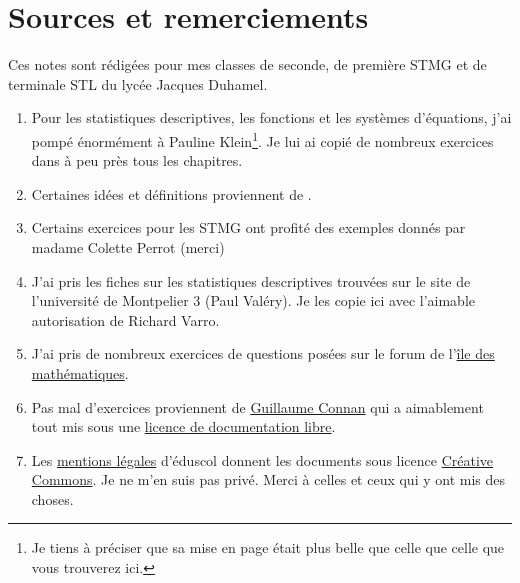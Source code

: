 
\section*{Sources et remerciements}

Ces notes sont rédigées pour mes classes de seconde, de première STMG et de terminale STL du lycée Jacques Duhamel.

\begin{enumerate}
    \item
        Pour les statistiques descriptives, les fonctions et les systèmes d'équations, j'ai pompé énormément à Pauline Klein\footnote{Je tiens à préciser que sa mise en page était plus belle que celle que celle que vous trouverez ici.}. Je lui ai copié de nombreux exercices dans à peu près tous les chapitres.
    \item
        Certaines idées et définitions proviennent de \cite{oklaEg}.
    \item
        Certains exercices pour les STMG ont profité des exemples donnés par madame Colette Perrot (merci) 
    \item
        J'ai pris les fiches \cite{qyKnLf} sur les statistiques descriptives trouvées sur le site de l'université de Montpelier 3 (Paul Valéry). Je les copie ici avec l'aimable autorisation de Richard Varro.
    \item
        J'ai pris de nombreux exercices de questions posées sur le forum de l'\href{http://www.ilemaths.net/forum_lycee.php}{île des mathématiques}.
    \item
        Pas mal d'exercices proviennent de \href{http://tehessin.tuxfamily.org/?page=35}{Guillaume Connan} qui a aimablement tout mis sous une \href{http://guilde.jeunes-chercheurs.org/Guilde/Licence/ldl.html}{licence de documentation libre}.
    \item
        Les \href{http://eduscol.education.fr/cid49154/mentions-legales.html}{mentions légales} d'éduscol donnent les documents sous licence \href{http://creativecommons.org/licenses/by-nc-sa/2.0/fr/}{Créative Commons}. Je ne m'en suis pas privé. Merci à celles et ceux qui y ont mis des choses.
\end{enumerate}

